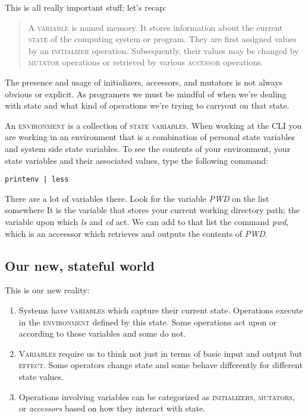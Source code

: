 \documentclass[]{tufte-handout}
\begin{document}
This is all really important stuff; let's recap:
\begin{quote}
A \textsc{variable} is named memory.  It stores information about the current \textsc{state} of the computing system or program.  They are first assigned values by an \textsc{initializer} operation. Subsequently, their values may be changed by \textsc{mutator} operations or retrieved by various \textsc{accessor} operations. 
\end{quote}
The presence and usage of initializers, accessors, and mutators is not always obvious or explicit. As programers we must be mindful of when we're  dealing with state and what kind of operations we're trying to carryout on that state. 


An \textsc{environment} is a collection of \textsc{state variables}.  When working at the CLI you are working in an environment that is a combination of personal state variables and system side state variables. To see the contents of your environment, your state variables and their associated values, type the following command:
\begin{verbatim}
printenv | less
\end{verbatim}
There are a lot of variables there. Look for the variable \textit{PWD} on the list somewhere  It is the variable that stores your current working directory path; the variable upon which \textit{ls} and \textit{cd} act. We can add to that list the command \textit{pwd}, which is an acceessor which retrieves and outputs the contents of \textit{PWD}.

\subsection{Our new, stateful world}

This is our new reality:
\begin{enumerate}
\item Systems have \textsc{variables} which capture their current state. Operations execute in the \textsc{environment} defined by this state. Some operations act upon or according to those variables and some do not. 
\item \textsc{Variables} require us to think not just in terms of basic input and output but \textsc{effect}.  Some operators change state and some behave differently for different state values. 
\item Operations involving variables can be categorized as \textsc{initializers}, \textsc{mutators}, or \textit{accessors} based on how they interact with state. 
\end{enumerate}
\end{document}
